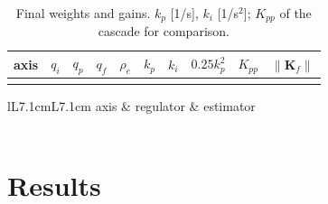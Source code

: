 \documentclass[10pt,a4paper]{article}
\numberwithin{equation}{section}
\begin{document}
\begin{table}[H]\centering\footnotesize\setlength{\tabcolsep}{4pt}
\caption{Final weights and gains. $k_p$ [1/s], $k_i$ [1/s$^2$]; $K_{pp}$ of the cascade for comparison.}\label{tab:weights}
\begin{tabular}{lrrrrrrrrr}\toprule
axis & $q_i$ & $q_p$ & $q_f$ & $\rho_e$ & $k_p$ & $k_i$ & $0.25k_p^2$ & $K_{pp}$ & $\|\mathbf K_f\|$ \\ \midrule
\\ \bottomrule
\end{tabular}\end{table}

\begin{table}[H]\centering\footnotesize
\caption{Poles of regulator and estimator (synthesis model): frequency in Hz, damping in brackets if below 1.}\label{tab:poles}
\begin{tabular}{lL{7.1cm}L{7.1cm}}\toprule
axis & regulator & estimator \\ \midrule
\\ \bottomrule
\end{tabular}\end{table}

\section{Results}\label{sec:res}
\end{document}
